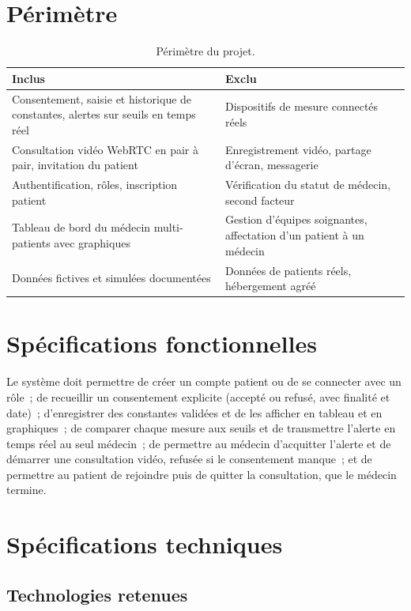 \section{Périmètre}

\begin{table}[H]
\centering
\caption{Périmètre du projet.}
\label{tab:perimetre}
\begin{tabularx}{\textwidth}{@{}X X@{}}
\toprule
\textbf{Inclus} & \textbf{Exclu} \\
\midrule
Consentement, saisie et historique de constantes, alertes sur seuils en temps réel & Dispositifs de mesure connectés réels \\
Consultation vidéo WebRTC en pair à pair, invitation du patient & Enregistrement vidéo, partage d'écran, messagerie \\
Authentification, rôles, inscription patient & Vérification du statut de médecin, second facteur \\
Tableau de bord du médecin multi-patients avec graphiques & Gestion d'équipes soignantes, affectation d'un patient à un médecin \\
Données fictives et simulées documentées & Données de patients réels, hébergement agréé \\
\bottomrule
\end{tabularx}
\end{table}

\section{Spécifications fonctionnelles}

Le système doit permettre de créer un compte patient ou de se connecter avec un rôle~; de recueillir un consentement explicite (accepté ou refusé, avec finalité et date)~; d'enregistrer des constantes validées et de les afficher en tableau et en graphiques~; de comparer chaque mesure aux seuils et de transmettre l'alerte en temps réel au seul médecin~; de permettre au médecin d'acquitter l'alerte et de démarrer une consultation vidéo, refusée si le consentement manque~; et de permettre au patient de rejoindre puis de quitter la consultation, que le médecin termine.

\section{Spécifications techniques}

\subsection{Technologies retenues}

